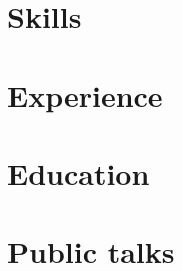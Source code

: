\documentclass[letter,10pt]{article}
\begin{document}


\section{Skills}


\section{Experience}


%

\section{Education}



\section{Public talks}

\end{document}
